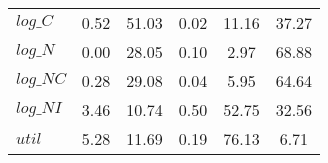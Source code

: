 \begin{center}
\begin{longtable}{lccccc}
$log\_C          $	 & 	        0.52	 & 	       51.03	 & 	        0.02	 & 	       11.16	 & 	       37.27 \\ 
$log\_N          $	 & 	        0.00	 & 	       28.05	 & 	        0.10	 & 	        2.97	 & 	       68.88 \\ 
$log\_NC         $	 & 	        0.28	 & 	       29.08	 & 	        0.04	 & 	        5.95	 & 	       64.64 \\ 
$log\_NI         $	 & 	        3.46	 & 	       10.74	 & 	        0.50	 & 	       52.75	 & 	       32.56 \\ 
${util}          $	 & 	        5.28	 & 	       11.69	 & 	        0.19	 & 	       76.13	 & 	        6.71 \\ 
\end{longtable}
 \end{center}
